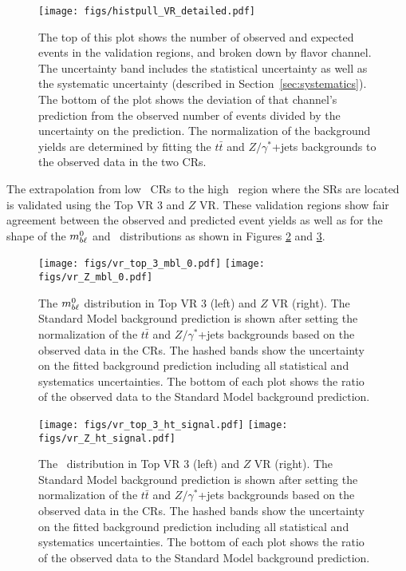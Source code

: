 \begin{figure}[ht]
\centering
\texttt{[image: figs/histpull\_VR\_detailed.pdf]}
\caption{The top of this plot shows the number of observed and expected
  events in the validation regions, and broken down by flavor channel.
  The uncertainty band includes the statistical uncertainty as well as the
  systematic uncertainty (described in Section~\ref{sec:systematics}). The
  bottom of the plot shows the deviation of that channel's prediction
  from the observed number of events divided by the uncertainty on the
  prediction. The normalization of the background yields are determined
  by fitting the $t\bar{t}$ and $Z/\gamma^{*}$+jets backgrounds to the observed
  data in the two CRs.
}
\label{fig:pull_dist_vr}
\end{figure}

The extrapolation from low \HT\ CRs to the high \HT\ region
where the SRs are located is validated using the Top VR 3
and $Z$ VR. These validation regions show fair
agreement between the observed and predicted event yields as well as
for the shape of the $m_{b\ell}^{0}$ and \HT\ distributions as shown in
Figures \ref{fig:mbl_vr} and \ref{fig:ht_vr}.

\begin{figure}
  \centering
  \texttt{[image: figs/vr\_top\_3\_mbl\_0.pdf]}
  \texttt{[image: figs/vr\_Z\_mbl\_0.pdf]}
  \caption{The $m_{b\ell}^0$ distribution in Top VR 3 (left)
    and $Z$ VR (right). The Standard Model background prediction is shown
    after setting the normalization of the $t\bar{t}$ and $Z/\gamma^{*}$+jets
    backgrounds based on the observed data in the CRs. The hashed bands show
    the uncertainty on the fitted background prediction including
    all statistical and systematics uncertainties.
    The bottom of each plot shows the ratio of the observed data to the
    Standard Model background prediction.
  }
  \label{fig:mbl_vr}
\end{figure}

\begin{figure}
  \centering
  \texttt{[image: figs/vr\_top\_3\_ht\_signal.pdf]}
  \texttt{[image: figs/vr\_Z\_ht\_signal.pdf]}
  \caption{The \HT\ distribution in Top VR 3 (left)
    and $Z$ VR (right). The Standard Model background prediction is shown
    after setting the normalization of the $t\bar{t}$ and $Z/\gamma^{*}$+jets
    backgrounds based on the observed data in the CRs. The hashed bands show
    the uncertainty on the fitted background prediction including
    all statistical and systematics uncertainties.
    The bottom of each plot shows the ratio of the observed data to the
    Standard Model background prediction.
  }
  \label{fig:ht_vr}
\end{figure}


